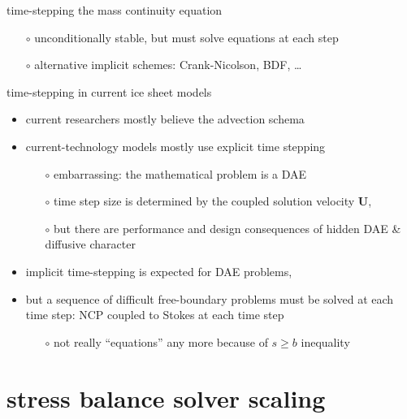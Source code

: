 \documentclass[svgnames,
               hyperref={colorlinks,citecolor=DeepPink4,linkcolor=FireBrick,urlcolor=Maroon},
               usepdftitle=false]  %
               {beamer}
\newcommand{\bU}{\mathbf{U}}
\begin{document}
\begin{frame}{time-stepping the mass continuity equation}
\begin{minipage}[t][60cm][t]{\textwidth}
\begin{itemize}
{    \begin{itemize}
    \item[$\circ$] unconditionally stable, but must solve equations at each step
    \item[$\circ$] alternative implicit schemes: Crank-Nicolson, BDF, \dots
    \end{itemize}
}
\end{itemize}
\end{minipage}
\end{frame}


\begin{frame}{time-stepping in current ice sheet models}

\begin{itemize}
\item current researchers mostly believe the advection schema
\item current-technology models mostly use explicit time stepping
    \begin{itemize}
    \item[$\circ$] embarrassing: \alert{the mathematical problem is a DAE}
    \item[$\circ$] time step size is determined by the coupled solution velocity $\bU$,
    \item[$\circ$] but there are performance and design consequences of hidden DAE \& diffusive character
    \end{itemize}

\medskip
\item<2> \alert{implicit time-stepping} is expected for DAE problems,
\item<2> but a sequence of difficult free-boundary problems must be solved at each time step: \alert{NCP coupled to Stokes at each time step}
    \begin{itemize}
    \item[$\circ$] not really ``equations'' any more because of $s\ge b$ inequality
    \end{itemize}
\end{itemize}
\end{frame}


\section{stress balance solver scaling}
\end{document}
